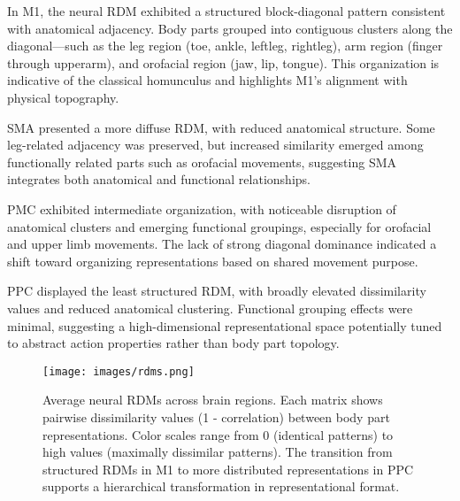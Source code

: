 \documentclass{article}
\begin{document}
In M1, the neural RDM exhibited a structured block-diagonal pattern consistent with anatomical adjacency. Body parts grouped into contiguous clusters along the diagonal—such as the leg region (toe, ankle, leftleg, rightleg), arm region (finger through upperarm), and orofacial region (jaw, lip, tongue). This organization is indicative of the classical homunculus and highlights M1's alignment with physical topography.

SMA presented a more diffuse RDM, with reduced anatomical structure. Some leg-related adjacency was preserved, but increased similarity emerged among functionally related parts such as orofacial movements, suggesting SMA integrates both anatomical and functional relationships.

PMC exhibited intermediate organization, with noticeable disruption of anatomical clusters and emerging functional groupings, especially for orofacial and upper limb movements. The lack of strong diagonal dominance indicated a shift toward organizing representations based on shared movement purpose.

PPC displayed the least structured RDM, with broadly elevated dissimilarity values and reduced anatomical clustering. Functional grouping effects were minimal, suggesting a high-dimensional representational space potentially tuned to abstract action properties rather than body part topology.

\begin{figure}[!htbp] \centering \texttt{[image: images/rdms.png]} \caption{Average neural RDMs across brain regions. Each matrix shows pairwise dissimilarity values (1 - correlation) between body part representations. Color scales range from 0 (identical patterns) to high values (maximally dissimilar patterns). The transition from structured RDMs in M1 to more distributed representations in PPC supports a hierarchical transformation in representational format.} \label{fig:neural_rdms} \end{figure}

\end{document}
